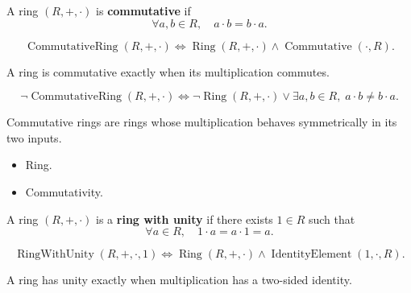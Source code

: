 \begin{definition}
\label{def:commutative-ring}
A ring $(R,+,\cdot)$ is \textbf{commutative} if
\[
\forall a,b \in R,\quad a\cdot b=b\cdot a.
\]
\end{definition}

\begin{remark*}
\[
\operatorname{CommutativeRing}(R,+,\cdot)
\Longleftrightarrow
\operatorname{Ring}(R,+,\cdot)
\land
\operatorname{Commutative}(\cdot,R).
\]
\end{remark*}

\begin{remark*}
A ring is commutative exactly when its multiplication commutes.
\end{remark*}

\begin{remark*}
\[
\neg\operatorname{CommutativeRing}(R,+,\cdot)
\Longleftrightarrow
\neg\operatorname{Ring}(R,+,\cdot)
\lor
\exists a,b\in R,\; a\cdot b\neq b\cdot a.
\]
\end{remark*}

\begin{remark*}[Interpretation]
Commutative rings are rings whose multiplication behaves symmetrically in its
two inputs.
\end{remark*}

\begin{remark*}[Dependencies]
\begin{itemize}
  \item Ring.
  \item Commutativity.
\end{itemize}
\end{remark*}

\begin{definition}
\label{def:ring-with-unity}
A ring $(R,+,\cdot)$ is a \textbf{ring with unity} if there exists
$1\in R$ such that
\[
\forall a \in R,\quad 1\cdot a=a\cdot 1=a.
\]
\end{definition}

\begin{remark*}
\[
\operatorname{RingWithUnity}(R,+,\cdot,1)
\Longleftrightarrow
\operatorname{Ring}(R,+,\cdot)
\land
\operatorname{IdentityElement}(1,\cdot,R).
\]
\end{remark*}

\begin{remark*}
A ring has unity exactly when multiplication has a two-sided identity.
\end{remark*}


